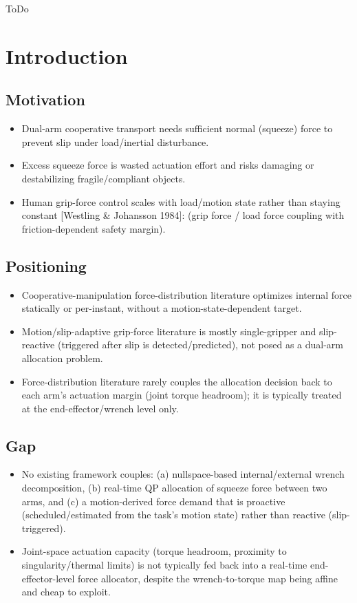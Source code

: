 \documentclass[conference]{IEEEtran}
\begin{document}
\begin{IEEEkeywords}
ToDo \cite{uchiyama1988symmetric}
\end{IEEEkeywords}

\section{Introduction}

\subsection{Motivation}
    \begin{itemize}
        \item Dual-arm cooperative transport needs sufficient normal (squeeze) force to prevent slip under load/inertial disturbance.
        \item Excess squeeze force is wasted actuation effort and risks damaging or destabilizing fragile/compliant objects.
        \item Human grip-force control scales with load/motion state rather than staying constant [Westling \& Johansson 1984]:  (grip force / load force coupling with friction-dependent safety margin).
    \end{itemize}

\subsection*{Positioning}
\begin{itemize}
    \item Cooperative-manipulation force-distribution literature optimizes internal force statically or per-instant, without a motion-state-dependent target.
    \item Motion/slip-adaptive grip-force literature is mostly single-gripper and slip-reactive (triggered after slip is detected/predicted), not posed as a dual-arm allocation problem.
    \item Force-distribution literature rarely couples the allocation decision back to each arm's actuation margin (joint torque headroom); it is typically treated at the end-effector/wrench level only.
\end{itemize}

\subsection*{Gap}
\begin{itemize}
    \item No existing framework couples: (a) nullspace-based internal/external wrench decomposition, (b) real-time QP allocation of squeeze force between two arms, and (c) a motion-derived force demand that is proactive (scheduled/estimated from the task's motion state) rather than reactive (slip-triggered).
    \item Joint-space actuation capacity (torque headroom, proximity to singularity/thermal limits) is not typically fed back into a real-time end-effector-level force allocator, despite the wrench-to-torque map being affine and cheap to exploit.
\end{itemize}
\end{document}
